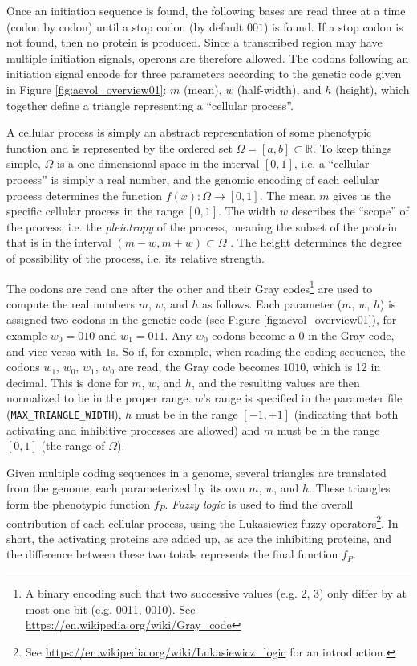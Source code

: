Once an initiation sequence is found, the following bases are read three at a time (codon by codon) until a stop codon (by default $001$) is found. If a stop codon is not found, then no protein is produced. Since a transcribed region may have multiple initiation signals, operons are therefore allowed. The codons following an initiation signal encode for three parameters according to the genetic code given in Figure \ref{fig:aevol_overview01}: $m$ (mean), $w$ (half-width), and $h$ (height), which together define a triangle representing a ``cellular process''.

A cellular process is simply an abstract representation of some phenotypic function and is represented by the ordered set $\Omega = \left[ a,b \right] \subset \mathbb{R}$. To keep things simple, $\Omega$ is a one-dimensional space in the interval $\left[0,1\right]$, i.e. a ``cellular process'' is simply a real number, and the genomic encoding of each cellular process determines the function $f(x) : \Omega \rightarrow \left[0,1\right]$. The mean $m$ gives us the specific cellular process in the range $\left[0,1\right]$. The width $w$ describes the ``scope'' of the process, i.e. the \textit{pleiotropy} of the process, meaning the subset of the protein that is in the interval $ \left(m - w, m + w\right) \subset \Omega$ . The height determines the degree of possibility of the process, i.e. its relative strength.

The codons are read one after the other and their Gray codes\footnote{A binary encoding such that two successive values (e.g. 2, 3) only differ by at most one bit (e.g. 0011, 0010). See \url{https://en.wikipedia.org/wiki/Gray_code}} are used to compute the real numbers $m$, $w$, and $h$ as follows. Each parameter ($m$, $w$, $h$) is assigned two codons in the genetic code (see Figure \ref{fig:aevol_overview01}), for example $w_0 = 010$ and $w_1 = 011$. Any $w_0$ codons become a $0$ in the Gray code, and vice versa with $1$s. So if, for example, when reading the coding sequence, the codons $w_1$, $w_0$, $w_1$, $w_0$ are read, the Gray code becomes $1010$, which is 12 in decimal. This is done for $m$, $w$, and $h$, and the resulting values are then normalized to be in the proper range. $w$'s range is specified in the parameter file (\texttt{MAX\_TRIANGLE\_WIDTH}), $h$ must be in the range $\left[-1,+1\right]$ (indicating that both activating and inhibitive processes are allowed) and $m$ must be in the range $\left[0,1\right]$ (the range of $\Omega$). 

Given multiple coding sequences in a genome, several triangles are translated from the genome, each parameterized by its own $m$, $w$, and $h$. These triangles form the phenotypic function $f_P$. \textit{Fuzzy logic} is used to find the overall contribution of each cellular process, using the Lukasiewicz fuzzy operators\footnote{See \url{https://en.wikipedia.org/wiki/Lukasiewicz\_logic} for an introduction.}. In short, the activating proteins are added up, as are the inhibiting proteins, and the difference between these two totals represents the final function $f_P$. 

